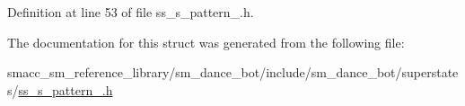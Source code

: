 Definition at line 53 of file ss\+\_\+s\+\_\+pattern\+\_.\+h.



The documentation for this struct was generated from the following file\+:\begin{DoxyCompactItemize}
\item 
smacc\+\_\+sm\+\_\+reference\+\_\+library/sm\+\_\+dance\+\_\+bot/include/sm\+\_\+dance\+\_\+bot/superstates/\hyperlink{include_2sm__dance__bot_2superstates_2ss__s__pattern__1_8h}{ss\+\_\+s\+\_\+pattern\+\_.\+h}\end{DoxyCompactItemize}
